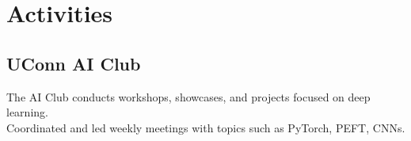 \documentclass[]{resume-template}
\begin{document}
\begin{minipage}[t]{0.33\textwidth}

  \section{Activities}\label{sec:activities}

  \subsection{UConn AI Club}\label{subsec:uconn-ai-club}
  \textbullet{} The AI Club conducts workshops, showcases, and projects focused on deep learning. \\
  \textbullet{} Coordinated and led weekly meetings with topics such as PyTorch, PEFT, CNNs.

  \vspace{\topsep}




\end{minipage}
\end{document}
